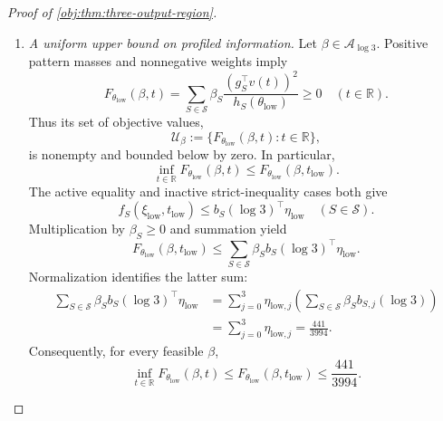 \documentclass[11pt]{article}
\begin{document}
\begin{proof}[Proof of \cref{obj:thm:three-output-region}]
\begin{enumerate}
\[=f_S(\xi_{\mathrm{low}},t_{\mathrm{low}})
\quad(S\in\mathcal K),
\]
\[
f_S(\xi_{\mathrm{low}},t_{\mathrm{low}})
<
b_S(\log3)^\top\eta_{\mathrm{low}}
\quad(S\notin\mathcal K).
\]
The point \(\xi_{\mathrm{low}}\) belongs to \(\mathcal D\). Together with the feasible positive active weights and stationarity established above, these equalities and strict inequalities supply its certificate in \cref{obj:def:support-regions}. Therefore
\[
\xi_{\mathrm{low}}\in\mathcal R_3.
\]

\item \textit{A uniform upper bound on profiled information.}
Let \(\beta\in\mathcal A_{\log3}\). Positive pattern masses and nonnegative weights imply
\[
F_{\theta_{\mathrm{low}}}(\beta,t)
=
\sum_{S\in\mathcal S}\beta_S
\frac{(g_S^\top v(t))^2}{h_S(\theta_{\mathrm{low}})}
\ge0
\quad(t\in\mathbb R).
\]
Thus its set of objective values,
\[
\mathcal U_\beta:=
\{F_{\theta_{\mathrm{low}}}(\beta,t):t\in\mathbb R\},
\]
is nonempty and bounded below by zero. In particular,
\[
\inf_{t\in\mathbb R}F_{\theta_{\mathrm{low}}}(\beta,t)
\le F_{\theta_{\mathrm{low}}}(\beta,t_{\mathrm{low}}).
\]
The active equality and inactive strict-inequality cases both give
\[
f_S(\xi_{\mathrm{low}},t_{\mathrm{low}})
\le b_S(\log3)^\top\eta_{\mathrm{low}}
\quad(S\in\mathcal S).
\]
Multiplication by \(\beta_S\ge0\) and summation yield
\[
F_{\theta_{\mathrm{low}}}(\beta,t_{\mathrm{low}})
\le
\sum_{S\in\mathcal S}\beta_S b_S(\log3)^\top\eta_{\mathrm{low}}.
\]
Normalization identifies the latter sum:
\[
\begin{aligned}
\sum_{S\in\mathcal S}\beta_S b_S(\log3)^\top\eta_{\mathrm{low}}
&=
\sum_{j=0}^3\eta_{\mathrm{low},j}
\left(\sum_{S\in\mathcal S}\beta_S b_{S,j}(\log3)\right)\\
&=\sum_{j=0}^3\eta_{\mathrm{low},j}
=\frac{441}{3994}.
\end{aligned}
\]
Consequently, for every feasible \(\beta\),
\[
\inf_{t\in\mathbb R}F_{\theta_{\mathrm{low}}}(\beta,t)
\le
F_{\theta_{\mathrm{low}}}(\beta,t_{\mathrm{low}})
\le\frac{441}{3994}.
\]


\end{enumerate}
\end{proof}
\end{document}
